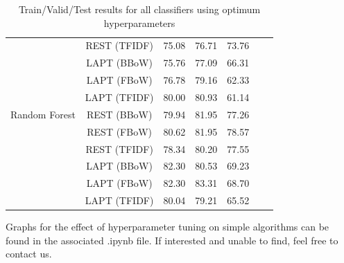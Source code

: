 \documentclass[comsoc,conference]{IEEEtran}
\begin{document}
\begin{table}[!htb]
\begin{tabularx}{\textwidth}{@{}l*{5}{C}c@{}}
& REST (TFIDF)     & 75.08 & 76.71 & 73.76 \\
& LAPT (BBoW)          & 75.76 & 77.09 & 66.31 \\
& LAPT (FBoW)          & 76.78 & 79.16 & 62.33 \\
& LAPT (TFIDF)         & 80.00 & 80.93 & 61.14 \\
\midrule
Random Forest
& REST (BBoW)      & 79.94 & 81.95 & 77.26 \\
& REST (FBoW)      & 80.62 & 81.95 & 78.57 \\
& REST (TFIDF)     & 78.34 & 80.20 & 77.55 \\
& LAPT (BBoW)          & 82.30 & 80.53 & 69.23 \\
& LAPT (FBoW)          & 82.30 & 83.31 & 68.70 \\
& LAPT (TFIDF)         & 80.04 & 79.21 & 65.52 \\
\bottomrule
\end{tabularx}
\caption{Train/Valid/Test results for all classifiers using optimum hyperparameters}
\label{A1}
\end{table}

\noindent Graphs for the effect of hyperparameter tuning on simple algorithms can be found in the associated .ipynb file. If interested and unable to find, feel free to contact us. 
\end{document}
